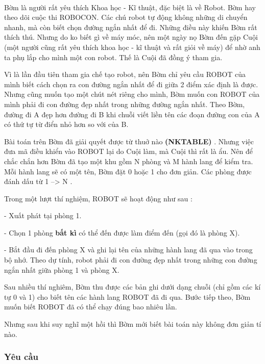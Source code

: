 

 

Bờm là người rất yêu thích Khoa học - Kĩ thuật, đặc biệt là về Robot. Bờm hay theo dõi cuộc thi ROBOCON. Các chú robot tự động không những di chuyển nhanh, mà còn biết chọn đường ngắn nhất để đi. Những điều này khiến Bờm rất thích thú. Nhưng do ko biết gì về máy móc, nên một ngày nọ Bờm đến gặp Cuội (một người cũng rất yêu thích khoa học - kĩ thuật và rất giỏi về máy) để nhờ anh ta phụ lắp cho mình một con robot. Thế là Cuội đã đồng ý tham gia.

Vì là lần đầu tiên tham gia chế tạo robot, nên Bờm chỉ yêu cầu ROBOT của mình biết cách chọn ra con đường ngắn nhất để đi giữa 2 điểm xác định là được. Nhưng cũng muốn tạo một chút nét riêng cho mình, Bờm muốn con ROBOT của mình phải đi con đường đẹp nhất trong những đường ngắn nhất. Theo Bờm, đường đi A đẹp hơn đường đi B khi chuỗi viết liền tên các đoạn đường con của A có thứ tự từ điển nhỏ hơn so với của B.

Bài toán trên Bờm đã giải quyết được từ thuở nào \textbf{ (NKTABLE) } . Nhưng việc đưa mã điều khiển vào ROBOT lại do Cuội làm, mà Cuội thì rất là ẩu. Nên để chắc chắn hơn Bờm đã tạo một khu gồm N phòng và M hành lang để kiểm tra. Mỗi hành lang sẽ có một tên, Bờm đặt 0 hoặc 1 cho đơn giản. Các phòng được đánh dấu từ 1 --> N .

Trong một lượt thí nghiệm, ROBOT sẽ hoạt động như sau :

- Xuất phát tại phòng 1.

- Chọn 1 phòng \textbf{ bất kì }có thể đến được làm điểm đến (gọi đó là phòng X).

- Bắt đầu đi đến phòng X và ghi lại tên của những hành lang đã qua vào trong bộ nhớ. Theo dự tính, robot phải đi con đường đẹp nhất trong những con đường ngắn nhất giữa phòng 1 và phòng X.

Sau nhiều thí nghiêm, Bờm thu được các bản ghi dưới dạng chuỗi (chỉ gồm các kí tự 0 và 1) cho biết tên các hành lang ROBOT đã đi qua. Bước tiếp theo, Bờm muốn biết ROBOT đã có thể chạy đúng bao nhiêu lần.

Nhưng sau khi suy nghĩ một hồi thì Bờm mới biết bài toán này không đơn giản tí nào.

\subsubsection{\textbf{Yêu cầu }}

